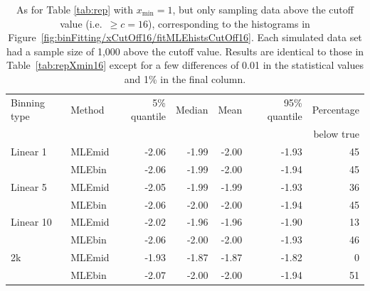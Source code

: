 \documentclass[12pt, letter]{article}
\newcommand{\xmin}{x_{\mathrm{min}}}
\newcommand{\fitMLEhistsCutOffSixteen}{\ref{fig:binFitting/xCutOff16/fitMLEhistsCutOff16}}
\begin{document}
\begin{table}
\caption{\label{tab:repCutOff16} As for Table \ref{tab:rep} with $\xmin = 1$,
  but only sampling data above the cutoff value (i.e.~${\geq}c=16$),
  corresponding to the histograms in Figure~\fitMLEhistsCutOffSixteen . Each
  simulated data set had a sample size of 1,000 above the cutoff value. Results
  are identical to those in Table~\ref{tab:repXmin16} except for a few
  differences of 0.01 in the statistical values and 1\% in the final column.}
\begin{tabular}{llrrrrr}
\hline Binning type & Method & 5\% quantile & Median & Mean & 95\% quantile &
Percentage\\ & & & & & & below true\\ \hline
Linear 1 & MLEmid & -2.06 & -1.99 & -2.00 & -1.93 & 45 \\ & MLEbin & -2.06 &
-1.99 & -2.00 & -1.94 & 45 \\ Linear 5 & MLEmid & -2.05 & -1.99 & -1.99 & -1.93
& 36 \\ & MLEbin & -2.06 & -2.00 & -2.00 & -1.94 & 45 \\ Linear 10 & MLEmid &
-2.02 & -1.96 & -1.96 & -1.90 & 13 \\ & MLEbin & -2.06 & -2.00 & -2.00 & -1.93 &
46 \\ 2k & MLEmid & -1.93 & -1.87 & -1.87 & -1.82 & 0 \\ & MLEbin & -2.07 &
-2.00 & -2.00 & -1.94 & 51 \\
\hline
\end{tabular}
\end{table}
\end{document}
